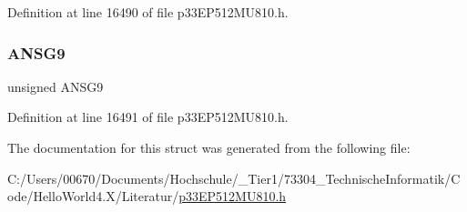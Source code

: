 Definition at line 16490 of file p33\+E\+P512\+M\+U810.\+h.

\mbox{\label{structtag_a_n_s_e_l_g_b_i_t_s_a92f7dba13ac155b496883c10c579635a}} 
\subsubsection{\texorpdfstring{A\+N\+S\+G9}{ANSG9}}
{\footnotesize\ttfamily unsigned A\+N\+S\+G9}



Definition at line 16491 of file p33\+E\+P512\+M\+U810.\+h.



The documentation for this struct was generated from the following file\+:\begin{DoxyCompactItemize}
\item 
C\+:/\+Users/00670/\+Documents/\+Hochschule/\+\_\+\+Tier1/73304\+\_\+\+Technische\+Informatik/\+Code/\+Hello\+World4.\+X/\+Literatur/\hyperlink{p33_e_p512_m_u810_8h}{p33\+E\+P512\+M\+U810.\+h}\end{DoxyCompactItemize}
